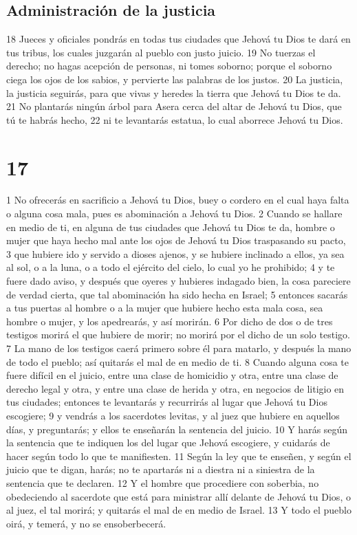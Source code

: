 \section{Administración de la justicia}

18 Jueces y oficiales pondrás en todas tus ciudades que Jehová tu Dios te dará en tus tribus, los cuales juzgarán al pueblo con justo juicio.
19 No tuerzas el derecho; no hagas acepción de personas, ni tomes soborno; porque el soborno ciega los ojos de los sabios, y pervierte las palabras de los justos.
20 La justicia, la justicia seguirás, para que vivas y heredes la tierra que Jehová tu Dios te da.
21 No plantarás ningún árbol para Asera cerca del altar de Jehová tu Dios, que tú te habrás hecho,
22 ni te levantarás estatua, lo cual aborrece Jehová tu Dios.

\chapter{17}

1 No ofrecerás en sacrificio a Jehová tu Dios, buey o cordero en el cual haya falta o alguna cosa mala, pues es abominación a Jehová tu Dios.
2 Cuando se hallare en medio de ti, en alguna de tus ciudades que Jehová tu Dios te da, hombre o mujer que haya hecho mal ante los ojos de Jehová tu Dios traspasando su pacto,
3 que hubiere ido y servido a dioses ajenos, y se hubiere inclinado a ellos, ya sea al sol, o a la luna, o a todo el ejército del cielo, lo cual yo he prohibido;
4 y te fuere dado aviso, y después que oyeres y hubieres indagado bien, la cosa pareciere de verdad cierta, que tal abominación ha sido hecha en Israel;
5 entonces sacarás a tus puertas al hombre o a la mujer que hubiere hecho esta mala cosa, sea hombre o mujer, y los apedrearás, y así morirán.
6 Por dicho de dos o de tres testigos morirá el que hubiere de morir; no morirá por el dicho de un solo testigo.
7 La mano de los testigos caerá primero sobre él para matarlo, y después la mano de todo el pueblo; así quitarás el mal de en medio de ti.
8 Cuando alguna cosa te fuere difícil en el juicio, entre una clase de homicidio y otra, entre una clase de derecho legal y otra, y entre una clase de herida y otra, en negocios de litigio en tus ciudades; entonces te levantarás y recurrirás al lugar que Jehová tu Dios escogiere;
9 y vendrás a los sacerdotes levitas, y al juez que hubiere en aquellos días, y preguntarás; y ellos te enseñarán la sentencia del juicio.
10 Y harás según la sentencia que te indiquen los del lugar que Jehová escogiere, y cuidarás de hacer según todo lo que te manifiesten.
11 Según la ley que te enseñen, y según el juicio que te digan, harás; no te apartarás ni a diestra ni a siniestra de la sentencia que te declaren.
12 Y el hombre que procediere con soberbia, no obedeciendo al sacerdote que está para ministrar allí delante de Jehová tu Dios, o al juez, el tal morirá; y quitarás el mal de en medio de Israel.
13 Y todo el pueblo oirá, y temerá, y no se ensoberbecerá.

